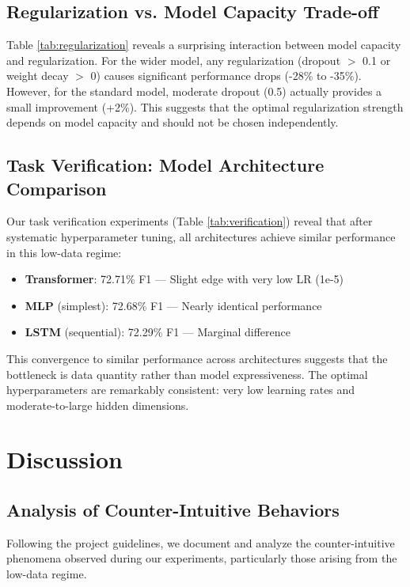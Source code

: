 \documentclass[10pt,twocolumn,letterpaper]{article}
\begin{document}
\subsection{Regularization vs. Model Capacity Trade-off}

Table \ref{tab:regularization} reveals a surprising interaction between model capacity and regularization. For the wider model, any regularization (dropout $>$ 0.1 or weight decay $>$ 0) causes significant performance drops (-28\% to -35\%). However, for the standard model, moderate dropout (0.5) actually provides a small improvement (+2\%). This suggests that the optimal regularization strength depends on model capacity and should not be chosen independently.

\subsection{Task Verification: Model Architecture Comparison}

Our task verification experiments (Table \ref{tab:verification}) reveal that after systematic hyperparameter tuning, all architectures achieve similar performance in this low-data regime:
\begin{itemize}
    \item \textbf{Transformer}: 72.71\% F1 --- Slight edge with very low LR (1e-5)
    \item \textbf{MLP} (simplest): 72.68\% F1 --- Nearly identical performance
    \item \textbf{LSTM} (sequential): 72.29\% F1 --- Marginal difference
\end{itemize}

This convergence to similar performance across architectures suggests that the bottleneck is data quantity rather than model expressiveness. The optimal hyperparameters are remarkably consistent: very low learning rates and moderate-to-large hidden dimensions.

\section{Discussion}

\subsection{Analysis of Counter-Intuitive Behaviors}

Following the project guidelines, we document and analyze the counter-intuitive phenomena observed during our experiments, particularly those arising from the low-data regime.
\end{document}
